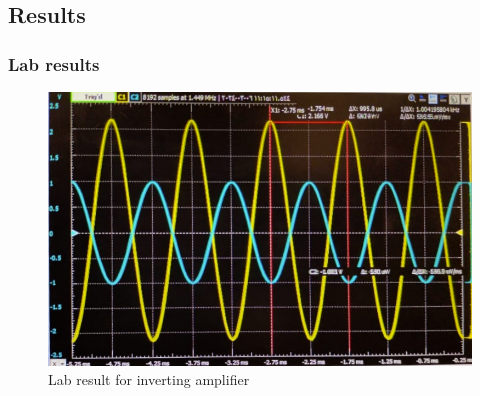 \documentclass[a4paper, 12pt, english]{article}
\begin{document}
\subsection{Results}
\subsubsection{Lab results}
\begin{figure}[h]
    \centering
    \includegraphics[width=\linewidth]{images/invertingLab.png}
    \caption{Lab result for inverting amplifier}
    \label{fig:Lab result for inverting amplifier}
\end{figure}
\end{document}

